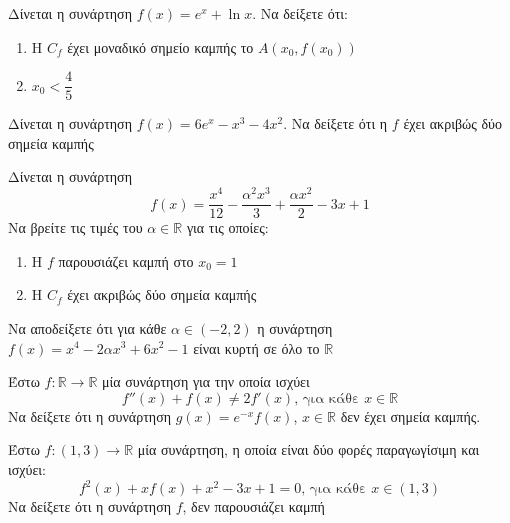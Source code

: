 \documentclass{presentation}
\begin{document}
\begin{askisi}
  Δίνεται η συνάρτηση $f(x)=e^x+\ln x$. Να δείξετε ότι:
  \begin{enumerate}
    \item<1-> Η $C_f$ έχει μοναδικό σημείο καμπής το $Α(x_0,f(x_0))$
    \item<2-> $x_0<\dfrac{4}{5}$
  \end{enumerate}

\end{askisi}

\begin{askisi}
  Δίνεται η συνάρτηση $f(x)=6e^x-x^3-4x^2$. Να δείξετε ότι η $f$ έχει ακριβώς δύο σημεία καμπής

\end{askisi}

\begin{askisi}
  Δίνεται η συνάρτηση $$f(x)=\dfrac{x^4}{12}-\dfrac{α^2x^3}{3}+\dfrac{αx^2}{2}-3x+1$$
  Να βρείτε τις τιμές του $α\in\mathbb{R}$ για τις οποίες:
  \begin{enumerate}
    \item<1-> Η $f$ παρουσιάζει καμπή στο $x_0=1$
    \item<2-> Η $C_f$ έχει ακριβώς δύο σημεία καμπής
  \end{enumerate}

\end{askisi}

\begin{askisi}
  Να αποδείξετε ότι για κάθε $α\in (-2,2)$ η συνάρτηση $f(x)=x^4-2αx^3+6x^2-1$ είναι κυρτή σε όλο το $\mathbb{R}$

\end{askisi}

\begin{askisi}
  Έστω $f:\mathbb{R}\to\mathbb{R}$ μία συνάρτηση για την οποία ισχύει
  $$f''(x)+f(x)\ne 2f'(x)\text{, για κάθε } x\in\mathbb{R}$$
  Να δείξετε ότι η συνάρτηση $g(x)=e^{-x}f(x)$, $x\in\mathbb{R}$ δεν έχει σημεία καμπής.

\end{askisi}

\begin{askisi}

  Έστω $f:(1,3)\to\mathbb{R}$ μία συνάρτηση, η οποία είναι δύο φορές παραγωγίσιμη και ισχύει:
  $$f^2(x)+xf(x)+x^2-3x+1=0\text{, για κάθε } x\in (1,3)$$
  Να δείξετε ότι η συνάρτηση $f$, δεν παρουσιάζει καμπή

\end{askisi}
\end{document}

